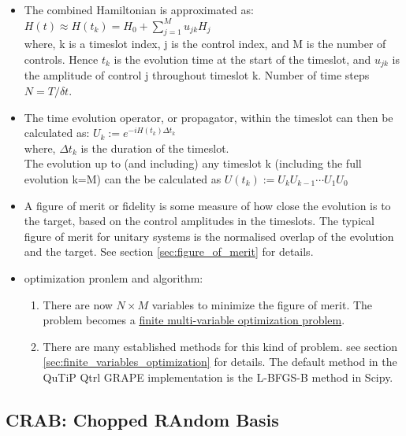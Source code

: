 \documentclass[12pt]{article}
\begin{document}
\begin{itemize}
    \item The combined Hamiltonian is approximated as: $H(t) \approx H\left(t_k\right)=H_0+\sum_{j=1}^M u_{j k} H_j$ \\
    where,  k is a timeslot index, 
            j is the control index, 
            and M is the number of controls. 
            Hence $t_k$ is the evolution time at the start of the timeslot, 
            and $u_{jk}$ is the amplitude of control j throughout timeslot k.
            Number of time steps $N=T/\delta t$.\\
    \item The time evolution operator, or propagator, within the timeslot can then be calculated as:  
            $U_k:=e^{-i H\left(t_k\right) \Delta t_k}$ \\
            where, $\Delta t_k$ is the duration of the timeslot.\\
            The evolution up to (and including) any timeslot k (including the full evolution k=M) can the be calculated as 
            $U\left(t_k\right):=U_k U_{k-1} \cdots U_1 U_0$
    \item A figure of merit or fidelity is some measure of how close the evolution is to the target, based on the control amplitudes in the timeslots. 
            The typical figure of merit for unitary systems is the normalised overlap of the evolution and the target. 
            See section \ref{sec:figure_of_merit} for details. 
    \item optimization pronlem and algorithm: 
        \begin{enumerate}
            \item There are now $N\times M$ variables to minimize the figure of merit. 
                The problem becomes a \underline{finite multi-variable optimization problem}.
            \item There are many established methods for this kind of problem. see section \ref{sec:finite_variables_optimization} for details. 
                The default method in the QuTiP Qtrl GRAPE implementation is the L-BFGS-B method in Scipy.
        \end{enumerate}
\end{itemize}




\subsection{CRAB: Chopped RAndom Basis}
\end{document}
